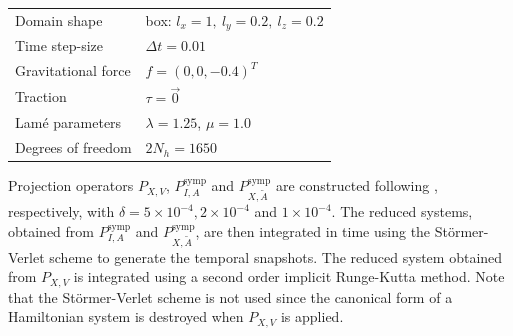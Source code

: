 \vspace{0.5cm}
\begin{center}
\begin{tabular}{|l|l|}
\hline
Domain shape & box: $l_x = 1,\ l_y = 0.2,\ l_z = 0.2$ \\
Time step-size & $\Delta t = 0.01$ \\
Gravitational force & $f = (0,0,-0.4)^T$ \\
Traction & $\tau = \vec 0$ \\
Lam\'e parameters & $\lambda = 1.25$, $\mu = 1.0$ \\
Degrees of freedom & $2N_{h} = 1650$ \\
\hline
\end{tabular}
\end{center}
\vspace{0.5cm}
Projection operators $P_{X,V}$, $P^{\text{symp}}_{I,A}$ and $P^{\text{symp}}_{X,\tilde A}$ are constructed following , respectively, with $\delta = 5\times 10^{-4}, 2\times 10^{-4}$ and $1\times 10^{-4}$. The reduced systems, obtained from $P^{\text{symp}}_{I,A}$ and $P^{\text{symp}}_{X,\tilde A}$, are then integrated in time using the St\"ormer-Verlet scheme to generate the temporal snapshots. The reduced system obtained from $P_{X,V}$ is integrated using a second order implicit Runge-Kutta method. Note that the St\"ormer-Verlet scheme is not used since the canonical form of a Hamiltonian system is destroyed when $P_{X,V}$ is applied.

